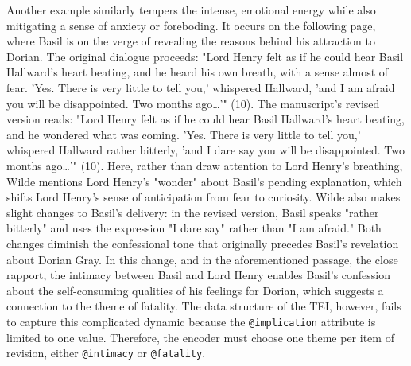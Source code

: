 \documentclass[11pt]{article}
\begin{document}
Another example similarly tempers the intense, emotional energy while
also mitigating a sense of anxiety or foreboding. It occurs on the
following page, where Basil is on the verge of revealing the reasons
behind his attraction to Dorian. The original dialogue proceeds: "Lord
Henry felt as if he could hear Basil Hallward's heart beating, and he
heard his own breath, with a sense almost of fear. 'Yes. There is very
little to tell you,' whispered Hallward, 'and I am afraid you will be
disappointed. Two months ago\ldots{}'" (10). The manuscript's revised
version reads: "Lord Henry felt as if he could hear Basil Hallward's
heart beating, and he wondered what was coming. 'Yes. There is very
little to tell you,' whispered Hallward rather bitterly, 'and I dare
say you will be disappointed. Two months ago\ldots{}'" (10). Here, rather
than draw attention to Lord Henry's breathing, Wilde mentions Lord
Henry's "wonder" about Basil's pending explanation, which shifts Lord
Henry's sense of anticipation from fear to curiosity. Wilde also makes
slight changes to Basil's delivery: in the revised version, Basil
speaks "rather bitterly" and uses the expression "I dare say" rather
than "I am afraid." Both changes diminish the confessional tone that
originally precedes Basil's revelation about Dorian Gray. In this
change, and in the aforementioned passage, the close rapport, the
intimacy between Basil and Lord Henry enables Basil's confession about
the self-consuming qualities of his feelings for Dorian, which
suggests a connection to the theme of fatality. The data structure of
the TEI, however, fails to capture this complicated dynamic because
the \texttt{@implication} attribute is limited to one value. Therefore, the
encoder must choose one theme per item of revision, either \texttt{@intimacy}
or \texttt{@fatality}.
\end{document}
